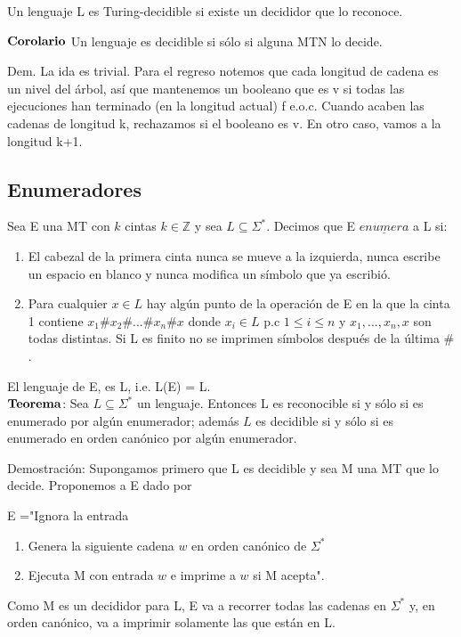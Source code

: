 \documentclass{homework}
\begin{document}
Un lenguaje L es Turing-decidible si existe un decididor que lo reconoce.

$\bf{Corolario}$ Un lenguaje es decidible si  sólo si alguna MTN lo decide.

Dem. La ida es trivial.
Para el regreso notemos que cada longitud de cadena es un nivel del árbol, así que mantenemos un booleano que es v si todas las ejecuciones han terminado (en la longitud actual) f e.o.c.
Cuando acaben las cadenas de longitud k, rechazamos si el booleano es v. En otro caso, vamos a la longitud k+1.

\subsection{Enumeradores}

Sea E una MT con $k$ cintas $k \in \mathds{Z}$ y sea $L \subseteq \Sigma^{*}$. Decimos que E $\underline{enumera}$ a L si:
\begin{enumerate}
	\item El cabezal de la primera cinta nunca se mueve a la izquierda, nunca escribe un espacio en blanco y nunca modifica un símbolo que ya escribió.
	\item Para cualquier $x \in L$ hay algún punto de la operación de E en la que la cinta 1 contiene $x_1 \# x_2 \# ... \# x_n \# x$ donde $x_i \in L$ p.c $1 \leq i \leq n$ y $x_1,...,x_n,x$ son todas distintas.
	Si L es finito no se imprimen símbolos después de la última $\#$.
\end{enumerate}

El lenguaje de E, es L, i.e. L(E) = L.\\

$\bf{Teorema}$: Sea $L \subseteq \Sigma^{*}$ un lenguaje. Entonces L es reconocible si y sólo si es enumerado por algún enumerador; además $L$ es decidible si y sólo si es enumerado en orden canónico por algún enumerador.

Demostración: Supongamos primero que L es decidible y sea M una MT que lo decide. Proponemos a E dado por 

E ="Ignora la entrada
\begin{enumerate}
	\item Genera la siguiente cadena $w$ en orden canónico de $\Sigma^{*}$
	\item Ejecuta M con entrada $w$ e imprime a $w$ si M acepta".
\end{enumerate}

Como M es un decididor para L, E va a recorrer todas las cadenas en $\Sigma^{*}$ y, en orden canónico, va a imprimir solamente las que están en L.
\end{document}
